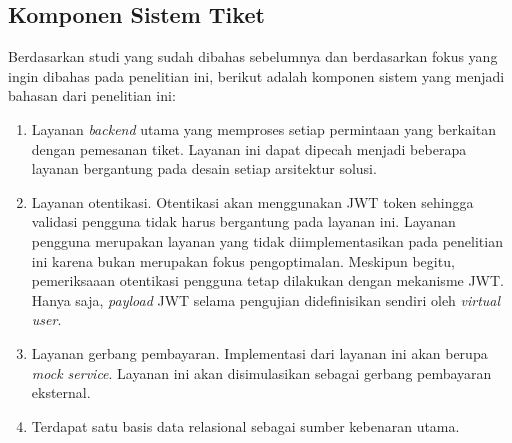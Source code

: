\subsection{Komponen Sistem Tiket}

Berdasarkan studi yang sudah dibahas sebelumnya dan berdasarkan fokus yang ingin dibahas pada penelitian ini, berikut adalah komponen sistem yang menjadi bahasan dari penelitian ini:

\begin{enumerate}
    \item Layanan \textit{backend} utama yang memproses setiap permintaan yang berkaitan dengan pemesanan tiket. Layanan ini dapat dipecah menjadi beberapa layanan bergantung pada desain setiap arsitektur solusi.
    \item Layanan otentikasi. Otentikasi akan menggunakan JWT token sehingga validasi pengguna tidak harus bergantung pada layanan ini. Layanan pengguna merupakan layanan yang tidak diimplementasikan pada penelitian ini karena bukan merupakan fokus pengoptimalan. Meskipun begitu, pemeriksaaan otentikasi pengguna tetap dilakukan dengan mekanisme JWT. Hanya saja, \textit{payload} JWT selama pengujian didefinisikan sendiri oleh \textit{virtual user}.
    \item Layanan gerbang pembayaran. Implementasi dari layanan ini akan berupa \textit{mock service}. Layanan ini akan disimulasikan sebagai gerbang pembayaran eksternal.
    \item Terdapat satu basis data relasional sebagai sumber kebenaran utama.
\end{enumerate}
